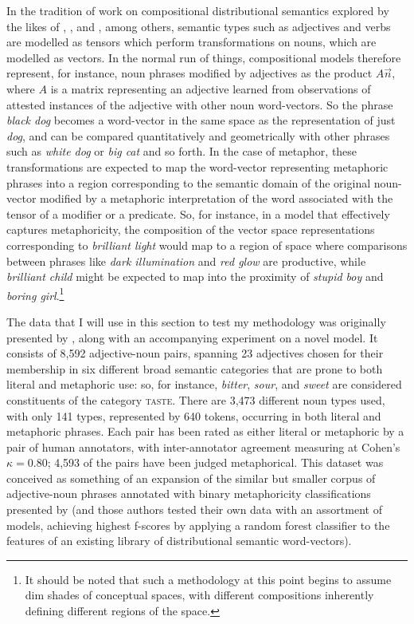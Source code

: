 In the tradition of work on compositional distributional semantics explored by the likes of \cite{MitchellEA2010}, \cite{BaroniEA2010}, and \cite{CoeckeEA2011}, among others, semantic types such as adjectives and verbs are modelled as tensors which perform transformations on nouns, which are modelled as vectors.  In the normal run of things, compositional models therefore represent, for instance, noun phrases modified by adjectives as the product $A\overrightarrow{n}$, where $A$ is a matrix representing an adjective learned from observations of attested instances of the adjective with other noun word-vectors.  So the phrase \emph{black dog} becomes a word-vector in the same space as the representation of just \emph{dog}, and can be compared quantitatively and geometrically with other phrases such as \emph{white dog} or \emph{big cat} and so forth.  In the case of metaphor, these transformations are expected to map the word-vector representing metaphoric phrases into a region corresponding to the semantic domain of the original noun-vector modified by a metaphoric interpretation of the word associated with the tensor of a modifier or a predicate.  So, for instance, in a model that effectively captures metaphoricity, the composition of the vector space representations corresponding to \emph{brilliant light} would map to a region of space where comparisons between phrases like \emph{dark illumination} and \emph{red glow} are productive, while \emph{brilliant child} might be expected to map into the proximity of \emph{stupid boy} and \emph{boring girl}.\footnote{It should be noted that such a methodology at this point begins to assume dim shades of  conceptual spaces, with different compositions inherently defining different regions of the space.}

The data that I will use in this section to test my methodology was originally presented by \cite{GutierrezEA2016}, along with an accompanying experiment on a novel model.  It consists of 8,592 adjective-noun pairs, spanning 23 adjectives chosen for their membership in six different broad semantic categories that are prone to both literal and metaphoric use: so, for instance, \emph{bitter}, \emph{sour}, and \emph{sweet} are considered constituents of the category \textsc{taste}.  There are 3,473 different noun types used, with only 141 types, represented by 640 tokens, occurring in both literal and metaphoric phrases.  Each pair has been rated as either literal or metaphoric by a pair of human annotators, with inter-annotator agreement measuring at Cohen's $\kappa = 0.80$; 4,593 of the pairs have been judged metaphorical.  This dataset was conceived as something of an expansion of the similar but smaller corpus of adjective-noun phrases annotated with binary metaphoricity classifications presented by \cite{TsvetkovEA2014} (and those authors tested their own data with an assortment of models, achieving highest f-scores by applying a random forest classifier to the features of an existing library of distributional semantic word-vectors).

